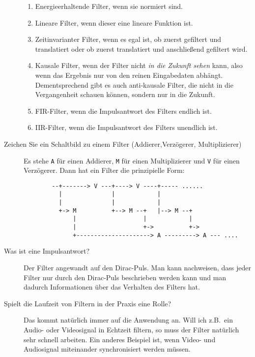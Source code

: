 \begin{description}
      \begin{enumerate}
        \item Energieerhaltende Filter, wenn sie normiert sind.
        \item Lineare Filter, wenn dieser eine lineare Funktion ist.
        \item Zeitinvarianter Filter, wenn es egal ist, ob zuerst gefiltert und translatiert
          oder ob zuerst translatiert und anschließend gefiltert wird.
        \item Kausale Filter, wenn der Filter nicht \emph{in die Zukunft sehen} kann, also
          wenn das Ergebnis nur von den reinen Eingabedaten abhängt. Dementsprechend gibt es auch 
          anti-kausale Filter, die nicht in die Vergangenheit schauen können, sondern nur in die 
          Zukunft.
        \item FIR-Filter, wenn die Impulsantwort des Filters endlich ist.
        \item IIR-Filter, wenn die Impulsantwort des Filters unendlich ist.
      \end{enumerate}
	\item[Zeichen Sie ein Schaltbild zu einem Filter (Addierer,Verzögerer, Multiplizierer)]
      Es stehe \lstinline|A| für einen Addierer, \lstinline|M| für einen Multiplizierer und
      \lstinline|V| für einen Verzögerer. Dann hat ein Filter die prinzipielle Form:

      \begin{lstlisting}
        --+-------> V ---+----> V ----+----- ......
          |              |            |
          |              |            |
          +-> M          +--> M --+   |--> M --+
              |                   |            |
              |                   +->          +->
              +---------------------> A ---------> A --- ....
      \end{lstlisting}
	\item[Was ist eine Impulsantwort?]
  	Der Filter angewandt auf den Dirac-Puls. Man kann nachweisen, dass jeder Filter nur durch den 
  	Dirac-Puls beschrieben werden kann und man dadurch Informationen über das Verhalten des Filters 
  	hat.
	\item[Spielt die Laufzeit von Filtern in der Praxis eine Rolle?]
  	Das kommt natürlich immer auf die Anwendung an. Will ich z.B.\ ein Audio- oder Videosignal in 
  	Echtzeit filtern, so muss der Filter natürlich sehr schnell arbeiten. Ein anderes Beispiel ist, 
  	wenn Video- und Audiosignal miteinander synchronisiert werden müssen.
\end{description}
